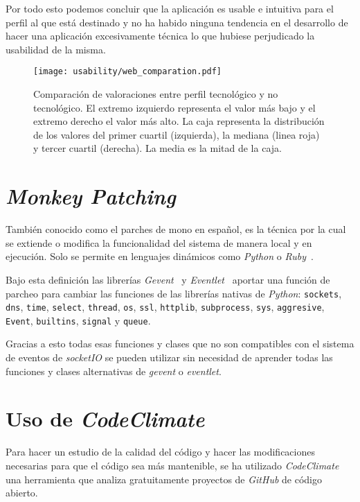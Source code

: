 Por todo esto podemos concluir que la aplicación es usable e intuitiva para el perfil al que está destinado y no ha habido ninguna tendencia en el desarrollo de hacer una aplicación excesivamente técnica lo que hubiese perjudicado la usabilidad de la misma.

\begin{figure}[h]
	\centering
	\texttt{[image: usability/web\_comparation.pdf]}
	\caption[Comparación de valoraciones entre perfil tecnológico y no tecnológico.]{Comparación de valoraciones entre perfil tecnológico y no tecnológico. El extremo izquierdo representa el valor más bajo y el extremo derecho el valor más alto. La caja representa la distribución de los valores del primer cuartil (izquierda), la mediana (linea roja) y tercer cuartil (derecha). La media es la mitad de la caja.}
	\label{fig:usab_comp}
\end{figure}

\section{\textit{Monkey Patching}}\label{cap:mokey}

También conocido como el parches de mono en español, es la técnica por la cual se extiende o modifica la funcionalidad del sistema de manera local y en ejecución. Solo se permite en lenguajes dinámicos como \textit{Python} o \textit{Ruby}~\cite{wiki:monkey_patch}.

Bajo esta definición las librerías \textit{Gevent}~\cite{tool:gevent} y \textit{Eventlet}~\cite{tool:eventlet} aportar una función de parcheo para cambiar las funciones de las librerías nativas de \textit{Python}: \texttt{sockets}, \texttt{dns}, \texttt{time}, \texttt{select}, \texttt{thread}, \texttt{os}, \texttt{ssl}, \texttt{httplib}, \texttt{subprocess}, \texttt{sys}, \texttt{aggresive}, \texttt{Event}, \texttt{builtins}, \texttt{signal} y \texttt{queue}.

Gracias a esto todas esas funciones y clases que no son compatibles con el sistema de eventos de \textit{socketIO} se pueden utilizar sin necesidad de aprender todas las funciones y clases alternativas de \textit{gevent} o \textit{eventlet}.

\section{Uso de \textit{CodeClimate}}
Para hacer un estudio de la calidad del código y hacer las modificaciones necesarias para que el código sea más mantenible, se ha utilizado \textit{CodeClimate} una herramienta que analiza gratuitamente proyectos de \textit{GitHub} de código abierto.

